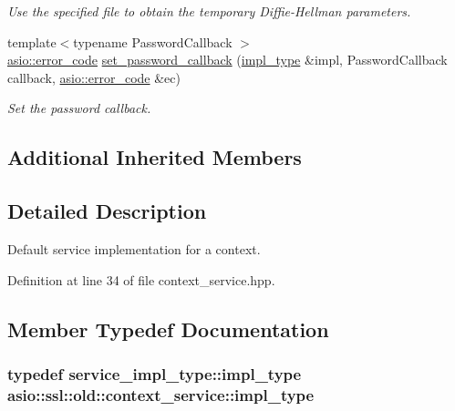 \begin{DoxyCompactItemize}
\begin{DoxyCompactList}\small\item\em Use the specified file to obtain the temporary Diffie-\/\+Hellman parameters. \end{DoxyCompactList}\item 
{\footnotesize template$<$typename Password\+Callback $>$ }\\\hyperlink{classasio_1_1error__code}{asio\+::error\+\_\+code} \hyperlink{classasio_1_1ssl_1_1old_1_1context__service_afcbfbee0e35cbcacbfb0047ed79b8fa1}{set\+\_\+password\+\_\+callback} (\hyperlink{classasio_1_1ssl_1_1old_1_1context__service_aa082808edcf9f9da07eaf4077d1d8de0}{impl\+\_\+type} \&impl, Password\+Callback callback, \hyperlink{classasio_1_1error__code}{asio\+::error\+\_\+code} \&ec)
\begin{DoxyCompactList}\small\item\em Set the password callback. \end{DoxyCompactList}\end{DoxyCompactItemize}
\subsection*{Additional Inherited Members}


\subsection{Detailed Description}
Default service implementation for a context. 

Definition at line 34 of file context\+\_\+service.\+hpp.



\subsection{Member Typedef Documentation}
\hypertarget{classasio_1_1ssl_1_1old_1_1context__service_aa082808edcf9f9da07eaf4077d1d8de0}{}
\subsubsection[{impl\+\_\+type}]{\setlength{\rightskip}{0pt plus 5cm}typedef {\bf service\+\_\+impl\+\_\+type\+::impl\+\_\+type} {\bf asio\+::ssl\+::old\+::context\+\_\+service\+::impl\+\_\+type}}\label{classasio_1_1ssl_1_1old_1_1context__service_aa082808edcf9f9da07eaf4077d1d8de0}


